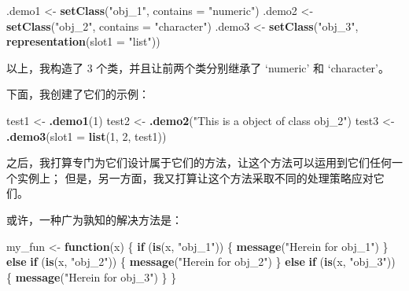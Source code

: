 \documentclass[
]{article}
\newenvironment{Shaded}{\begin{snugshade}}{\end{snugshade}}
\newcommand{\ControlFlowTok}[1]{\textcolor[rgb]{0.13,0.29,0.53}{\textbf{#1}}}
\newcommand{\DataTypeTok}[1]{\textcolor[rgb]{0.13,0.29,0.53}{#1}}
\newcommand{\DecValTok}[1]{\textcolor[rgb]{0.00,0.00,0.81}{#1}}
\newcommand{\KeywordTok}[1]{\textcolor[rgb]{0.13,0.29,0.53}{\textbf{#1}}}
\newcommand{\NormalTok}[1]{#1}
\newcommand{\StringTok}[1]{\textcolor[rgb]{0.31,0.60,0.02}{#1}}
\begin{document}
\begin{Shaded}
\begin{Highlighting}[]
\NormalTok{.demo1 \textless{}{-}}\StringTok{ }\KeywordTok{setClass}\NormalTok{(}\StringTok{"obj\_1"}\NormalTok{, }\DataTypeTok{contains =} \StringTok{"numeric"}\NormalTok{)}
\NormalTok{.demo2 \textless{}{-}}\StringTok{ }\KeywordTok{setClass}\NormalTok{(}\StringTok{"obj\_2"}\NormalTok{, }\DataTypeTok{contains =} \StringTok{"character"}\NormalTok{)}
\NormalTok{.demo3 \textless{}{-}}\StringTok{ }\KeywordTok{setClass}\NormalTok{(}\StringTok{"obj\_3"}\NormalTok{, }\KeywordTok{representation}\NormalTok{(}\DataTypeTok{slot1 =} \StringTok{"list"}\NormalTok{))}
\end{Highlighting}
\end{Shaded}

以上，我构造了 3 个类，并且让前两个类分别继承了 `numeric' 和 `character'。

下面，我创建了它们的示例：

\begin{Shaded}
\begin{Highlighting}[]
\NormalTok{test1 \textless{}{-}}\StringTok{ }\KeywordTok{.demo1}\NormalTok{(}\DecValTok{1}\NormalTok{)}
\NormalTok{test2 \textless{}{-}}\StringTok{ }\KeywordTok{.demo2}\NormalTok{(}\StringTok{"This is a object of class \textquotesingle{}obj\_2\textquotesingle{}"}\NormalTok{)}
\NormalTok{test3 \textless{}{-}}\StringTok{ }\KeywordTok{.demo3}\NormalTok{(}\DataTypeTok{slot1 =} \KeywordTok{list}\NormalTok{(}\DecValTok{1}\NormalTok{, }\DecValTok{2}\NormalTok{, test1))}
\end{Highlighting}
\end{Shaded}

之后，我打算专门为它们设计属于它们的方法，让这个方法可以运用到它们任何一个实例上；
但是，另一方面，我又打算让这个方法采取不同的处理策略应对它们。

或许，一种广为孰知的解决方法是：

\begin{Shaded}
\begin{Highlighting}[]
\NormalTok{my\_fun \textless{}{-}}\StringTok{ }\ControlFlowTok{function}\NormalTok{(x) \{}
  \ControlFlowTok{if}\NormalTok{ (}\KeywordTok{is}\NormalTok{(x, }\StringTok{"obj\_1"}\NormalTok{)) \{}
    \KeywordTok{message}\NormalTok{(}\StringTok{"Herein for obj\_1"}\NormalTok{)}
\NormalTok{  \} }\ControlFlowTok{else} \ControlFlowTok{if}\NormalTok{ (}\KeywordTok{is}\NormalTok{(x, }\StringTok{"obj\_2"}\NormalTok{)) \{}
    \KeywordTok{message}\NormalTok{(}\StringTok{"Herein for obj\_2"}\NormalTok{)}
\NormalTok{  \} }\ControlFlowTok{else} \ControlFlowTok{if}\NormalTok{ (}\KeywordTok{is}\NormalTok{(x, }\StringTok{"obj\_3"}\NormalTok{)) \{}
    \KeywordTok{message}\NormalTok{(}\StringTok{"Herein for obj\_3"}\NormalTok{)}
\NormalTok{  \}}
\NormalTok{\}}
\end{Highlighting}
\end{Shaded}
\end{document}

